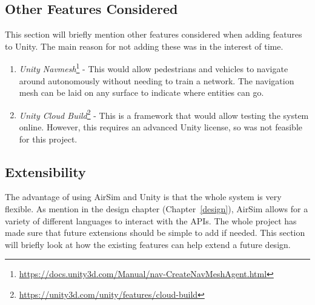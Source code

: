 \subsection{Other Features Considered}
This section will briefly mention other features considered when adding features to Unity. The main reason for not adding these was in the interest of time.
\begin{enumerate}
\item \emph{Unity Navmesh}\footnote{\url{https://docs.unity3d.com/Manual/nav-CreateNavMeshAgent.html}} - This would allow pedestrians and vehicles to navigate around autonomously without needing to train a network. The navigation mesh can be laid on any surface to indicate where entities can go.
\item \emph{Unity Cloud Build}\footnote{\url{https://unity3d.com/unity/features/cloud-build}} - This is a framework that would allow testing the system online. However, this requires an advanced Unity license, so was not feasible for this project.
\end{enumerate}


\subsection{Extensibility}
The advantage of using AirSim and Unity is that the whole system is very flexible. As mention in the design chapter (Chapter~\ref{design}), AirSim allows for a variety of different languages to interact with the APIs. The whole project has made sure that future extensions should be simple to add if needed. This section will briefly look at how the existing features can help extend a future design.

